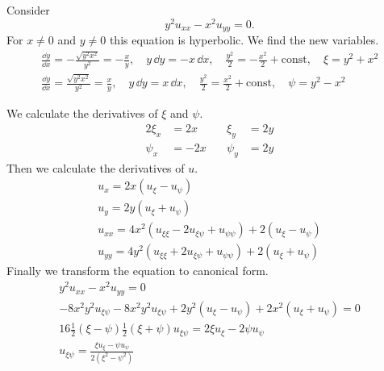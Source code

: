 \begin{Example}
  \label{y^2u_xx-x^2u_yy=0}
  Consider
  \[
  y^2 u_{x x} - x^2 u_{y y} = 0.
  \]
  For $x \neq 0$ and $y \neq 0$ this equation is hyperbolic. We find the new variables.
  \begin{gather*}
    \frac{\dd y}{\dd x} = - \frac{\sqrt{ y^2 x^2 }}{y^2} = - \frac{x}{y}, \quad 
    y \,\dd y = - x \,\dd x, \quad
    \frac{y^2}{2} = - \frac{x^2}{2} + \mathrm{const}, \quad
    \xi = y^2 + x^2 
    \\
    \frac{\dd y}{\dd x} = \frac{\sqrt{ y^2 x^2 }}{y^2} = \frac{x}{y}, \quad 
    y \,\dd y = x \,\dd x, \quad
    \frac{y^2}{2} = \frac{x^2}{2} + \mathrm{const}, \quad
    \psi = y^2 - x^2
  \end{gather*}

  We calculate the derivatives of $\xi$ and $\psi$.
  \begin{alignat*}{2}
    \xi_x &= 2 x &\quad \xi_y &= 2 y 
    \\
    \psi_x &= -2 x  &\quad \psi_y &= 2 y 
  \end{alignat*}
  Then we calculate the derivatives of $u$.
  \begin{gather*}
    u_x = 2 x ( u_\xi - u_\psi ) 
    \\
    u_y = 2 y ( u_\xi + u_\psi ) 
    \\
    u_{x x} = 4 x^2 ( u_{\xi \xi} - 2 u_{\xi \psi} + u_{\psi \psi} ) + 2 ( u_\xi - u_\psi ) 
    \\
    u_{y y} = 4 y^2 ( u_{\xi \xi} + 2 u_{\xi \psi} + u_{\psi \psi} ) + 2 ( u_\xi + u_\psi )
  \end{gather*}
  Finally we transform the equation to canonical form.
  \begin{gather*}
    y^2 u_{x x} - x^2 u_{y y} = 0 
    \\
    - 8 x^2 y^2 u_{\xi \psi} - 8 x^2 y^2 u_{\xi \psi} + 2 y^2 ( u_\xi - u_\psi ) + 2 x^2 ( u_\xi + u_\psi ) = 0 
    \\
    16 \frac{1}{2} (\xi - \psi) \frac{1}{2} (\xi + \psi) u_{\xi \psi} = 2 \xi u_\xi - 2 \psi u_\psi 
    \\
    \boxed{
      u_{\xi \psi} = \frac{\xi u_\xi - \psi u_\psi}{ 2 (\xi^2 - \psi^2) }
      }
  \end{gather*}
\end{Example}









